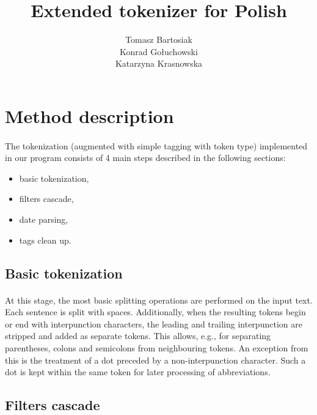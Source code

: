 \documentclass[oneside,12pt]{article}
\title{Extended tokenizer for Polish}
\author{Tomasz Bartosiak \\ Konrad Gołuchowski \\ Katarzyna Krasnowska}
\date{}
\begin{document}
\maketitle

\section{Method description}

\paragraph{}
The tokenization (augmented with simple tagging with token type) implemented in
our program consists of 4 main steps described in the following sections:
\begin{itemize}
  \item basic tokenization,
  \item filters cascade,
  \item date parsing,
  \item tags clean up.
\end{itemize}

\subsection{Basic tokenization}

\paragraph{}
At this stage, the most basic splitting operations are performed on the input text. Each sentence is split with spaces. Additionally, when the resulting tokens begin or end with interpunction characters, the leading and trailing interpunction are stripped and added as separate tokens. This allows, e.g., for separating parentheses, colons and semicolons from neighbouring tokens. An exception from this is the treatment of a dot preceded by a non-interpunction character. Such a dot is kept within the same token for later processing of abbreviations.

\subsection{Filters cascade}
\end{document}
